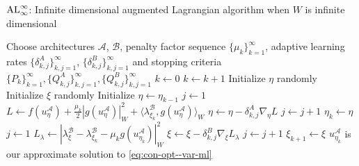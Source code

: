 \begin{algorithm}[!ht]
\caption{${\rm AL}_\infty^\infty$: Infinite dimensional augmented Lagrangian algorithm when $W$ is infinite dimensional}
\label{algo:dl-al-infinite--var-ml}
\begin{algorithmic}[1]
    \STATE Choose architectures $\mathcal A$, $\mathcal B$, penalty factor sequence $\{\mu_k\}_{k=1}^\infty$, adaptive learning rates $\{\delta_{k,j}^A\}_{k,j=1}^\infty$, $\{\delta_{k, j}^B\}_{k,j=1}^\infty$ and stopping criteria $\{P_k\}_{k=1}^\infty, \{Q_{k,j}^A\}_{k, j=1}^\infty, \{Q_{k,j}^B\}_{k, j=1}^\infty$
    \STATE $k\leftarrow0$
        \STATE $k \leftarrow k+1$
                \STATE Initialize $\eta$ randomly
                \STATE Initialize $\xi$ randomly
            \ELSE
                \STATE Initialize $\eta\leftarrow \eta_{k-1}$
        \ENDIF
        \STATE $j\leftarrow 1$
            \STATE $L\leftarrow f(u_{\eta}^{\mathcal A})+\frac{\mu_k}{2}|g(u_{\eta}^{\mathcal A})|^2_W + \langle\lambda_{\xi_k}^{\mathcal B}, g(u_{\eta}^{\mathcal A})\rangle_W$
            \STATE $\eta\leftarrow\eta-\delta_{k,j}^A\nabla_\eta L$
            \STATE $j\leftarrow j+1$
        \ENDWHILE
        \STATE $\eta_k\leftarrow\eta$
        \STATE $j\leftarrow 1$
            \STATE $L_\lambda\leftarrow \left|\lambda_{\xi}^{\mathcal B}-\lambda_{\xi_{k}}^{\mathcal B}-\mu_{k} g(u_{\eta_{k}}^{\mathcal A})\right|_W^2$
            \STATE $\xi\leftarrow\xi-\delta_{k,j}^B\nabla_\xi L_\lambda$
            \STATE $j\leftarrow j+1$
        \ENDWHILE
        \STATE $\xi_{k+1}\leftarrow\xi$
    \ENDWHILE
    \STATE $u_{\eta_k}^{\mathcal A}$ is our approximate solution to \eqref{eq:con-opt--var-ml}
\end{algorithmic}
\end{algorithm}


